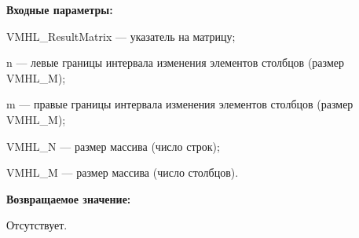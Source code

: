 \textbf{Входные параметры:}
 
VMHL\_ResultMatrix --- указатель на матрицу;
 
n --- левые границы интервала изменения элементов столбцов (размер VMHL\_M);
 
m --- правые границы интервала изменения элементов столбцов (размер VMHL\_M);
 
VMHL\_N --- размер массива (число строк);
 
VMHL\_M --- размер массива (число столбцов).

\textbf{Возвращаемое значение:}

Отсутствует.
